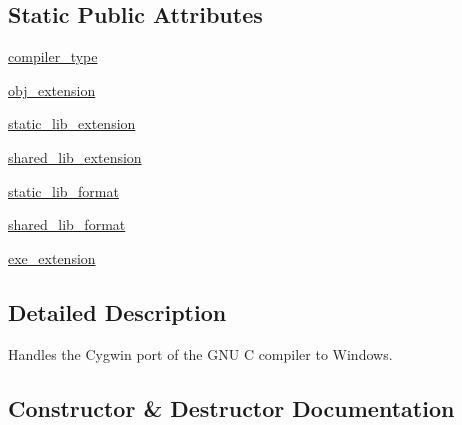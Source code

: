 \subsection*{Static Public Attributes}
\begin{DoxyCompactItemize}
\item 
\hyperlink{classsetuptools_1_1__distutils_1_1cygwinccompiler_1_1CygwinCCompiler_a3a1d382833342124b8e81998b9607d98}{compiler\+\_\+type}
\item 
\hyperlink{classsetuptools_1_1__distutils_1_1cygwinccompiler_1_1CygwinCCompiler_a9fdcfadf272ef86e69d7a2855387557e}{obj\+\_\+extension}
\item 
\hyperlink{classsetuptools_1_1__distutils_1_1cygwinccompiler_1_1CygwinCCompiler_a7a29ed5ccff260a62a1931822d15a279}{static\+\_\+lib\+\_\+extension}
\item 
\hyperlink{classsetuptools_1_1__distutils_1_1cygwinccompiler_1_1CygwinCCompiler_a93b7504d471e2cea0350f49f77c14b7f}{shared\+\_\+lib\+\_\+extension}
\item 
\hyperlink{classsetuptools_1_1__distutils_1_1cygwinccompiler_1_1CygwinCCompiler_adac3216f03fede0676f5d73398039c57}{static\+\_\+lib\+\_\+format}
\item 
\hyperlink{classsetuptools_1_1__distutils_1_1cygwinccompiler_1_1CygwinCCompiler_a339d5947bd2b282a41ef93b5ef608292}{shared\+\_\+lib\+\_\+format}
\item 
\hyperlink{classsetuptools_1_1__distutils_1_1cygwinccompiler_1_1CygwinCCompiler_a27b82ac04b6401f43864501c839457f7}{exe\+\_\+extension}
\end{DoxyCompactItemize}


\subsection{Detailed Description}
\begin{DoxyVerb}Handles the Cygwin port of the GNU C compiler to Windows.
\end{DoxyVerb}
 

\subsection{Constructor \& Destructor Documentation}
\mbox{\label{classsetuptools_1_1__distutils_1_1cygwinccompiler_1_1CygwinCCompiler_a20c5545bedca176ee905c662d7bf7466}} 

